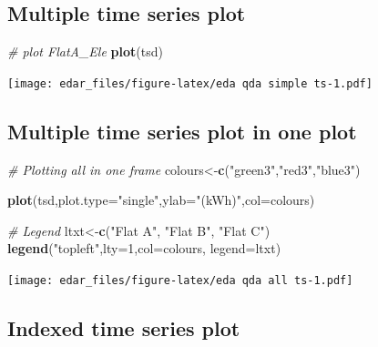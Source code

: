 \documentclass[
  a4paperpaper,
]{book}
\newenvironment{Shaded}{\begin{snugshade}}{\end{snugshade}}
\newcommand{\CommentTok}[1]{\textcolor[rgb]{0.56,0.35,0.01}{\textit{#1}}}
\newcommand{\DataTypeTok}[1]{\textcolor[rgb]{0.13,0.29,0.53}{#1}}
\newcommand{\DecValTok}[1]{\textcolor[rgb]{0.00,0.00,0.81}{#1}}
\newcommand{\KeywordTok}[1]{\textcolor[rgb]{0.13,0.29,0.53}{\textbf{#1}}}
\newcommand{\NormalTok}[1]{#1}
\newcommand{\StringTok}[1]{\textcolor[rgb]{0.31,0.60,0.02}{#1}}
\let\oldShaded\Shaded
\let\endoldShaded\endShaded
\renewenvironment{Shaded}{\footnotesize\oldShaded}{\endoldShaded}
\begin{document}
\hypertarget{multiple-time-series-plot}{%
\subsection{Multiple time series plot}\label{multiple-time-series-plot}}

\begin{Shaded}
\begin{Highlighting}[]
\CommentTok{# plot FlatA_Ele}
\KeywordTok{plot}\NormalTok{(tsd)}
\end{Highlighting}
\end{Shaded}

\texttt{[image: edar\_files/figure-latex/eda qda simple ts-1.pdf]}

\hypertarget{multiple-time-series-plot-in-one-plot}{%
\subsection{Multiple time series plot in one plot}\label{multiple-time-series-plot-in-one-plot}}

\begin{Shaded}
\begin{Highlighting}[]
\CommentTok{# Plotting all in one frame}
\NormalTok{colours<-}\KeywordTok{c}\NormalTok{(}\StringTok{"green3"}\NormalTok{,}\StringTok{"red3"}\NormalTok{,}\StringTok{"blue3"}\NormalTok{)}

\KeywordTok{plot}\NormalTok{(tsd,}\DataTypeTok{plot.type=}\StringTok{"single"}\NormalTok{,}\DataTypeTok{ylab=}\StringTok{"(kWh)"}\NormalTok{,}\DataTypeTok{col=}\NormalTok{colours)}

\CommentTok{# Legend}
\NormalTok{ltxt<-}\KeywordTok{c}\NormalTok{(}\StringTok{"Flat A"}\NormalTok{, }\StringTok{"Flat B"}\NormalTok{, }\StringTok{"Flat C"}\NormalTok{)}
\KeywordTok{legend}\NormalTok{(}\StringTok{"topleft"}\NormalTok{,}\DataTypeTok{lty=}\DecValTok{1}\NormalTok{,}\DataTypeTok{col=}\NormalTok{colours, }\DataTypeTok{legend=}\NormalTok{ltxt)}
\end{Highlighting}
\end{Shaded}

\texttt{[image: edar\_files/figure-latex/eda qda all ts-1.pdf]}

\hypertarget{indexed-time-series-plot}{%
\subsection{Indexed time series plot}\label{indexed-time-series-plot}}
\end{document}
